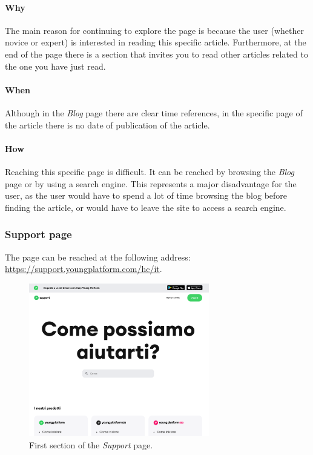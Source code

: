 \paragraph{Why}

The main reason for continuing to explore the page is because the user 
(whether novice or expert) is interested in reading this specific article. 
Furthermore, at the end of the page there is a section that invites you to 
read other articles related to the one you have just read.

\paragraph{When}

Although in the \textit{Blog} page there are clear time references, in the 
specific page of the article there is no date of publication of the article.

\paragraph{How}

Reaching this specific page is difficult. It can be reached by browsing the 
\textit{Blog} page or by using a search engine. This represents a major 
disadvantage for the user, as the user would have to spend a lot of time 
browsing the blog before finding the article, or would have to leave the 
site to access a search engine.

\subsubsection{Support page}

The page can be reached at the following address: 
\href{https://support.youngplatform.com/hc/it}{https://support.youngplatform.com/hc/it}.

\begin{figure}[H]
  \centering
  \includegraphics[width=0.70\textwidth]{res/images/internal-pages/support/support-1.png}
  \caption{First section of the \textit{Support} page.}
  \label{fig:support-1}
\end{figure}

